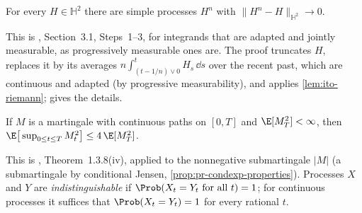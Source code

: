 \begin{lemma}\label{lem:ito-density}
For every $H\in\mathbb H^2$ there are simple processes $H^n$ with
$\|H^n-H\|_{\mathbb H^2}\to0$.
\end{lemma}

This is \textcite{oksendal}, Section~3.1, Steps~1--3, for integrands that are adapted and
jointly measurable, as progressively measurable ones are. The proof truncates $H$, replaces
it by its averages $n\int_{(t-1/n)\vee0}^tH_s\,\dd s$ over the recent past, which are
continuous and adapted (by progressive measurability), and applies \cref{lem:ito-riemann};
 gives the details.

\begin{lemma}\label{lem:ito-doob}
If $M$ is a martingale with continuous paths on $[0,T]$ and $\E[M_T^2]<\infty$, then
$\E\big[\sup_{0\le t\le T}M_t^2\big]\le4\,\E[M_T^2]$.
\end{lemma}

This is \textcite{karatzas-shreve}, Theorem~1.3.8(iv), applied to the nonnegative submartingale
$|M|$ (a submartingale by conditional Jensen, \cref{prop:pr-condexp-properties}). Processes
$X$ and $Y$ are \emph{indistinguishable} if $\Prob(X_t=Y_t\text{ for all }t)=1$; for
continuous processes it suffices that $\Prob(X_t=Y_t)=1$ for every rational $t$.

